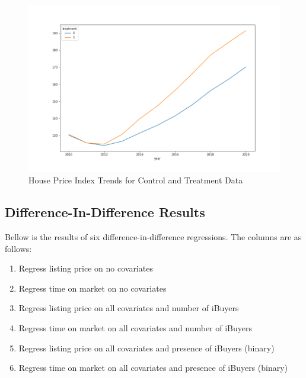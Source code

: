 \begin{figure}[h]
    \centering
    \includegraphics[width=.8\linewidth]{../data_and_processing/media/pta.png}
    \caption{House Price Index Trends for Control and Treatment Data}
    \label{pta}
\end{figure}

\clearpage

\subsection{Difference-In-Difference Results}

Bellow is the results of six difference-in-difference regressions. The columns are as follows:

\begin{enumerate}

    \item Regress listing price on no covariates

    \item Regress time on market on no covariates

    \item Regress listing price on all covariates and number of iBuyers

    \item Regress time on market  on all covariates and number of iBuyers

    \item Regress listing price on all covariates and presence of iBuyers (binary)

    \item Regress time on market on all covariates and presence of iBuyers (binary)

\end{enumerate}



